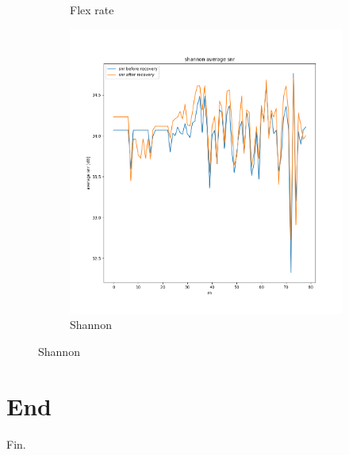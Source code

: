 \documentclass{beamer}
\begin{document}
\begin{frame}
\begin{figure}[h]
\begin{subfigure}{0.31\textwidth}
				\caption{Flex rate}
			\end{subfigure}
			\hspace*{\fill}
			\begin{subfigure}{0.31\textwidth}
				\includegraphics[width=\linewidth]{Pictures/shannon average snr.png}
				\caption{Shannon}
			\end{subfigure}
		\end{figure}
	\end{frame}
	\section{End}
	\begin{frame}
		\begin{Huge}
			\begin{center}
				Fin.
			\end{center}
		\end{Huge}
	\end{frame}
\end{document}
